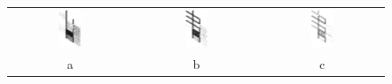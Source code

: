 \documentclass[9pt]{beamer}
\begin{document}
\begin{frame}
\begin{columns}
\begin{figure}
\begin{tabular}{c c  c }
\includegraphics[width=0.20\textwidth]{canny2dmultiR}&\includegraphics[width=0.20\textwidth]{Cannysigma3rot}&\includegraphics[width=0.20\textwidth]{SteerableFilterSigma2rot}\\
a & b & c \\

\end{tabular}
\end{figure}
\end{columns}
\end{frame}
\end{document}
